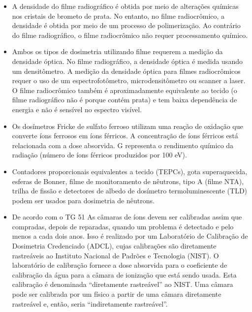 \documentclass[11pt,a4paper]{article}
\newcounter{exemplo}
\begin{document}
\begin{exemplo}
\begin{itemize}
        \item A densidade do filme radiográfico é obtida por meio de alterações químicas nos cristais de brometo de prata. No entanto, no filme radiocrômico, a densidade é obtida por meio de um processo de polimerização. Ao contrário do filme radiográfico, o filme radiocrômico não requer processamento químico. 
        
        \item Ambos os tipos de dosimetria utilizando filme requerem a medição da densidade óptica. No filme radiográfico, a densidade óptica é medida usando um densitômetro. A medição da densidade óptica para filmes radiocrômicos requer o uso de um espectrofotômetro, microdensitômetro ou scanner a laser. O filme radiocrômico também é aproximadamente equivalente ao tecido (o filme radiográfico não é porque contém prata) e tem baixa dependência de energia e não é sensível no espectro visível.
        
        \item Os dosímetros Fricke de sulfato ferroso utilizam uma reação de oxidação que converte íons ferrosos em íons férricos. A concentração de íons férricos está relacionada com a dose absorvida. G representa o rendimento químico da radiação (número de íons férricos produzidos por 100 eV).
        
        \item Contadores proporcionais equivalentes a tecido (TEPCs), gota superaquecida, esferas de Bonner, filme de monitoramento de nêutrons, tipo A (filme NTA), trilha de fissão e detectores de albedo de dosímetro termoluminescente (TLD) podem ser usados para dosimetria de nêutrons.
        
        \item De acordo com o TG 51 As câmaras de íons devem ser calibradas assim que compradas, depois de reparadas, quando um problema é detectado e pelo menos a cada dois anos. Isso é realizado por um Laboratório de Calibração de Dosimetria Credenciado (ADCL), cujas calibrações são diretamente rastreáveis ao Instituto Nacional de Padrões e Tecnologia (NIST). O laboratório de calibração fornece a dose absorvida para o coeficiente de calibração da água para a câmara de ionização que está sendo usada. Esta calibração é denominada “diretamente rastreável” ao NIST. Uma câmara pode ser calibrada por um físico a partir de uma câmara diretamente rastreável e, então, seria “indiretamente rastreável”.
        

\end{itemize}
\end{exemplo}
\end{document}

